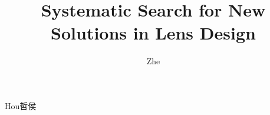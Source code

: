 \documentclass{dissertation}
\begin{document}
\title[Optional Subtitle]{Systematic Search for New Solutions in Lens Design}
\author{Zhe}{Hou}{哲}{侯}


%


%

\tableofcontents

\mainmatter

\thumbtrue









\appendix



\thumbfalse



\end{document}
